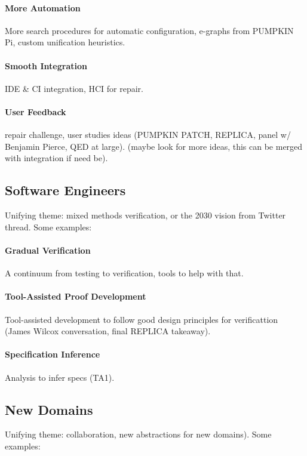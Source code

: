 \paragraph{More Automation} More search procedures for automatic configuration, e-graphs from PUMPKIN Pi, custom unification heuristics.

\paragraph{Smooth Integration} IDE \& CI integration, HCI for repair.

\paragraph{User Feedback} repair challenge, user studies ideas (PUMPKIN PATCH, REPLICA, panel w/ Benjamin Pierce, QED at large). (maybe look for more ideas, this can be merged with integration if need be).

\subsection*{Software Engineers}

Unifying theme: mixed methods verification, or the 2030 vision from Twitter thread. Some examples:

\paragraph{Gradual Verification} A continuum from testing to verification, tools to help with that.

\paragraph{Tool-Assisted Proof Development} Tool-assisted development to follow good design principles for verificattion (James Wilcox conversation, final REPLICA takeaway).

\paragraph{Specification Inference} Analysis to infer specs (TA1).

\subsection*{New Domains}

Unifying theme: collaboration, new abstractions for new domains). Some examples:

